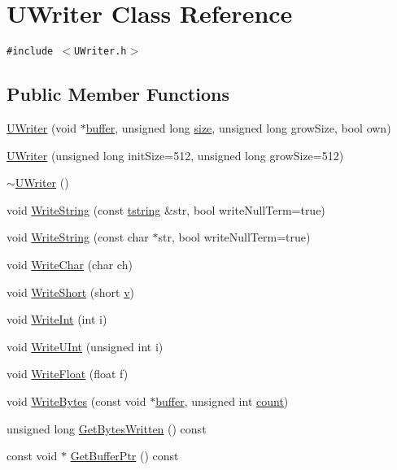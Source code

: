 \hypertarget{class_u_writer}{
\section{UWriter Class Reference}
\label{class_u_writer}
}
{\tt \#include $<$UWriter.h$>$}

\subsection*{Public Member Functions}
\begin{CompactItemize}
\item 
\hyperlink{class_u_writer_84ac4e433ef43762c38e973b50b2a900}{UWriter} (void $\ast$\hyperlink{glext__bak_8h_c4fdb15bdbcd63430bab668b5419ed9f}{buffer}, unsigned long \hyperlink{glext__bak_8h_3d1e3edfcf61ca2d831883e1afbad89e}{size}, unsigned long growSize, bool own)
\item 
\hyperlink{class_u_writer_676a90967b367e7787dfc1441a0f43cc}{UWriter} (unsigned long initSize=512, unsigned long growSize=512)
\item 
\hyperlink{class_u_writer_8121227135a3e5565f9fb01d3864b112}{$\sim$UWriter} ()
\item 
void \hyperlink{class_u_writer_bbe55ee0c4a3b202b365da202899d410}{WriteString} (const \hyperlink{common__afx_8h_816fa58fd77499b0edb2c69ebe803d5c}{tstring} \&str, bool writeNullTerm=true)
\item 
void \hyperlink{class_u_writer_753241171303a3cc3257e323846f2d3f}{WriteString} (const char $\ast$str, bool writeNullTerm=true)
\item 
void \hyperlink{class_u_writer_3c706400f5fe0fe26cd8ebfe5a55d13a}{WriteChar} (char ch)
\item 
void \hyperlink{class_u_writer_ad53e1a9063eec9545834eb288fe0767}{WriteShort} (short \hyperlink{glext__bak_8h_5cf89b94f7478c0ebc4429b60e7ef93b}{v})
\item 
void \hyperlink{class_u_writer_2012d798142a97cacf03227395c2e24c}{WriteInt} (int i)
\item 
void \hyperlink{class_u_writer_a1f6d44d3988a40cc188ab237c5edc0a}{WriteUInt} (unsigned int i)
\item 
void \hyperlink{class_u_writer_b70c7cb62e406390fb68ddbb22ad25e7}{WriteFloat} (float f)
\item 
void \hyperlink{class_u_writer_db6161ee8139f7215bddb0c0e9f7f427}{WriteBytes} (const void $\ast$\hyperlink{glext__bak_8h_c4fdb15bdbcd63430bab668b5419ed9f}{buffer}, unsigned int \hyperlink{wglext_8h_98d18d6b4e3ba4ed266c6fb54c839d70}{count})
\item 
unsigned long \hyperlink{class_u_writer_362bb4a3c111c793e22927a6b26afe0c}{GetBytesWritten} () const 
\item 
const void $\ast$ \hyperlink{class_u_writer_9bd5aca0223d14eea6a715449e613300}{GetBufferPtr} () const 
\end{CompactItemize}


